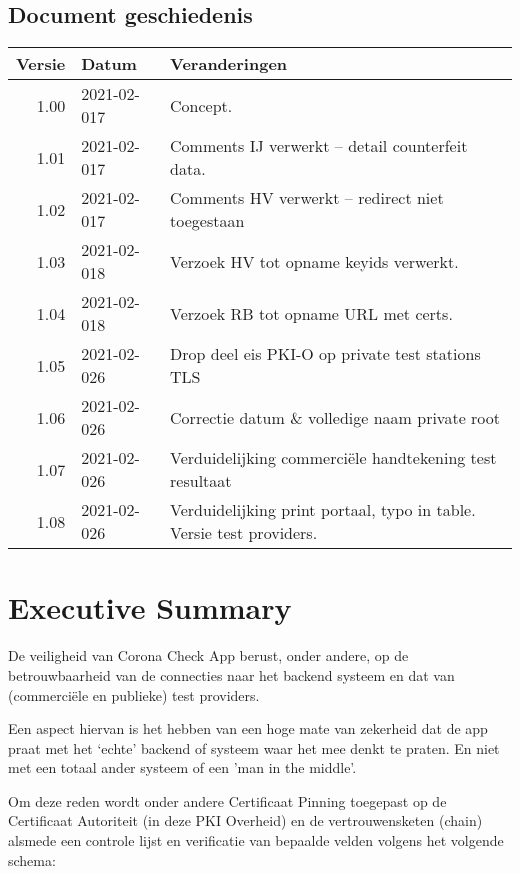\documentclass[11.0pt,twoside,openright]{report}
\begin{document}

\maketitle

\section*{Document geschiedenis}

\begin{tabular}{|r|l|l|}
\hline
Versie & Datum & Veranderingen \\
\hline
\hline
1.00 & 2021-02-017 & Concept. \\
\hline
1.01 & 2021-02-017 & Comments IJ verwerkt -- detail counterfeit data.\\
\hline
1.02 & 2021-02-017 & Comments HV verwerkt -- redirect niet toegestaan \\
\hline
1.03 & 2021-02-018 & Verzoek HV tot opname keyids verwerkt.  \\
\hline
1.04 & 2021-02-018 & Verzoek RB tot opname URL met certs.  \\
\hline
1.05 & 2021-02-026 & Drop deel eis PKI-O op private test stations TLS \\
\hline
1.06 & 2021-02-026 & Correctie datum \& volledige naam private root \\
\hline
1.07 & 2021-02-026 & Verduidelijking commerciële handtekening test resultaat \\
\hline
1.08 & 2021-02-026 & Verduidelijking print portaal, typo in table. Versie test providers. \\
\hline
\end{tabular}


\pagebreak
\chapter{Executive Summary}

De veiligheid van Corona Check App berust, onder andere, op de betrouwbaarheid van de connecties naar het backend systeem en dat van (commerciële en publieke) test providers.

Een aspect hiervan is het hebben van een hoge mate van zekerheid dat de app praat met het `echte' backend of systeem waar het mee denkt te praten. En niet met een totaal ander systeem of een 'man in the middle'.

Om deze reden wordt onder andere Certificaat Pinning toegepast op de Certificaat Autoriteit (in deze PKI Overheid) en de vertrouwensketen (chain) alsmede een controle lijst en verificatie van bepaalde velden volgens het volgende schema:
\end{document}
